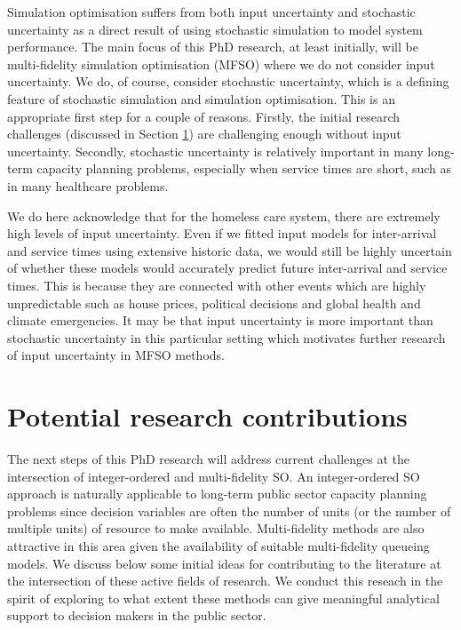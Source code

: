 \documentclass[12pt,a4paper]{article}
\begin{document}
Simulation optimisation suffers from both input uncertainty and stochastic uncertainty as a direct result of using stochastic simulation to model system performance. The main focus of this PhD research, at least initially, will be multi-fidelity simulation optimisation (MFSO) where we do not consider input uncertainty. We do, of course, consider stochastic uncertainty, which is a defining feature of stochastic simulation and simulation optimisation. This is an appropriate first step for a couple of reasons. Firstly, the initial research challenges (discussed in Section \ref{mfso}) are challenging enough without input uncertainty. Secondly, stochastic uncertainty is relatively important in many long-term capacity planning problems, especially when service times are short, such as in many healthcare problems. 

We do here acknowledge that for the homeless care system, there are extremely high levels of input uncertainty. Even if we fitted input models for inter-arrival and service times using extensive historic data, we would still be highly uncertain of whether these models would accurately predict future inter-arrival and service times. This is because they are connected with other events which are highly unpredictable such as house prices, political decisions and global health and climate emergencies. It may be that input uncertainty is more important than stochastic uncertainty in this particular setting which motivates further research of input uncertainty in MFSO methods. 

\newpage

\section{Potential research contributions} \label{mfso}

The next steps of this PhD research will address current challenges at the intersection of integer-ordered and multi-fidelity SO. An integer-ordered SO approach is naturally applicable to long-term public sector capacity planning problems since decision variables are often the number of units (or the number of multiple units) of resource to make available. Multi-fidelity methods are also attractive in this area given the availability of suitable multi-fidelity queueing models. We discuss below some initial ideas for contributing to the literature at the intersection of these active fields of research. We conduct this reseach in the spirit of exploring to what extent these methods can give meaningful analytical support to decision makers in the public sector.
\end{document}
